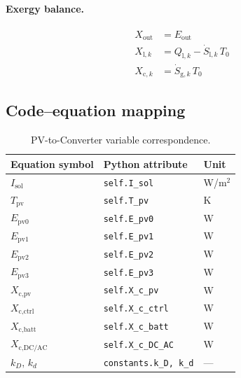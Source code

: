 \paragraph{Exergy balance.}
\begin{align}
  X_\text{out}        &= E_\text{out}                                       \label{eq:pv-generic-Xout}  \\
  X_{\text{l},k}      &= Q_{\text{l},k} - \dot{S}_{\text{l},k}\,T_0       \label{eq:pv-generic-Xl}    \\
  X_{\text{c},k}      &= \dot{S}_{\text{g},k}\,T_0                         \label{eq:pv-generic-Xc}
\end{align}

\subsection{Code--equation mapping}

\begin{table}[h!]
\centering
\caption{PV-to-Converter variable correspondence.}
\label{tab:pv-mapping}
\begin{tabular}{@{}lll@{}}
\toprule
Equation symbol & Python attribute & Unit \\
\midrule
$I_\text{sol}$         & \texttt{self.I\_sol}       & W/m$^2$ \\
$T_\text{pv}$          & \texttt{self.T\_pv}        & K       \\
$E_\text{pv0}$         & \texttt{self.E\_pv0}       & W       \\
$E_\text{pv1}$         & \texttt{self.E\_pv1}       & W       \\
$E_\text{pv2}$         & \texttt{self.E\_pv2}       & W       \\
$E_\text{pv3}$         & \texttt{self.E\_pv3}       & W       \\
$X_\text{c,pv}$        & \texttt{self.X\_c\_pv}     & W       \\
$X_\text{c,ctrl}$      & \texttt{self.X\_c\_ctrl}   & W       \\
$X_\text{c,batt}$      & \texttt{self.X\_c\_batt}   & W       \\
$X_\text{c,DC/AC}$     & \texttt{self.X\_c\_DC\_AC} & W       \\
$k_D,\,k_d$            & \texttt{constants.k\_D, k\_d} & --- \\
\bottomrule
\end{tabular}
\end{table}
